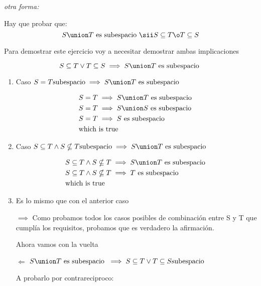 \bigskip

\separador
\textit{otra forma:}
\separador

\bigskip

Hay que probar que:
$$
  S \union T \text{ es subespacio }
  \sii
  S \subseteq T \o T \subseteq S
$$

Para demostrar este ejercicio voy a necesitar demostrar ambas implicaciones

$$ S \subseteq T \lor T \subseteq S \implies S \union T \text{ es subespacio } $$
\begin{enumerate}
  \item Caso $S = T \text{subespacio}\implies S \union T \text{ es subespacio }$

        \begin{align}
           & S = T \implies S \union T \text{ es subespacio } \\
           & S = T \implies S \union S \text{ es subespacio } \\
           & S = T \implies S \text{ es subespacio }          \\
           & \text{which is true}
        \end{align}

  \item Caso $S \subseteq T \land S \nsubseteq T \text{subespacio}\implies S \union T \text{ es subespacio }$

        \begin{align}
           & S \subseteq T \land S \nsubseteq T \implies S \union T \text{ es subespacio } \\
           & S \subseteq T \land S \nsubseteq T \implies T \text{ es subespacio }          \\
           & \text{which is true}
        \end{align}

  \item Es lo mismo que con el anterior caso

        $ \implies $ Como probamos todos los casos posibles de combinación entre S y T que cumplía los requisitos,
        probamos que es verdadero la afirmación.

        Ahora vamos con la vuelta

        $\Longleftarrow $ $S \union T \text{ es subespacio } \implies S \subseteq T \lor T \subseteq S \text{subespacio} $

        A probarlo por contrareciproco: \\


\end{enumerate}
